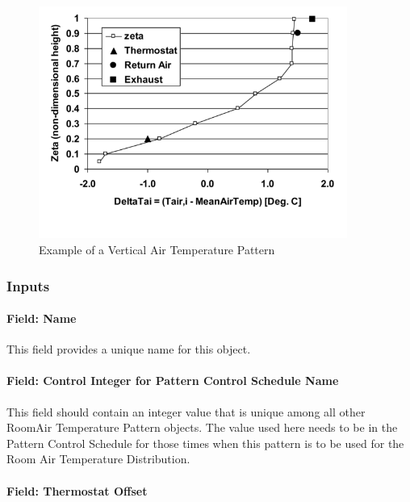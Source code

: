 \begin{figure}[hbtp] %
\centering
\includegraphics[width=0.9\textwidth, height=0.9\textheight, keepaspectratio=true]{media/image079.png}
\caption{Example of a Vertical Air Temperature Pattern \protect \label{fig:example-of-a-vertical-air-temperature-pattern}}
\end{figure}

\subsubsection{Inputs}\label{inputs-4-028}

\paragraph{Field: Name}\label{field-name-4-024}

This field provides a unique name for this object.

\paragraph{Field: Control Integer for Pattern Control Schedule Name}\label{field-control-integer-for-pattern-control-schedule-name-2}

This field should contain an integer value that is unique among all other RoomAir Temperature Pattern objects. The value used here needs to be in the Pattern Control Schedule for those times when this pattern is to be used for the Room Air Temperature Distribution.

\paragraph{Field: Thermostat Offset}\label{field-thermostat-offset-1}


